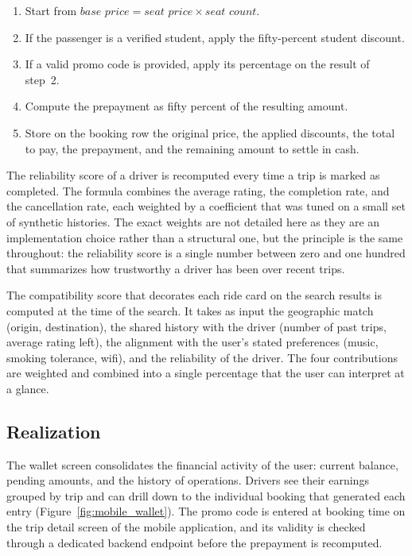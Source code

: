 \begin{enumerate}[noitemsep]
    \item Start from $\textit{base price} = \textit{seat price} \times \textit{seat count}$.
    \item If the passenger is a verified student, apply the fifty-percent student discount.
    \item If a valid promo code is provided, apply its percentage on the result of step~2.
    \item Compute the prepayment as fifty percent of the resulting amount.
    \item Store on the booking row the original price, the applied discounts, the total to pay, the prepayment, and the remaining amount to settle in cash.
\end{enumerate}

The reliability score of a driver is recomputed every time a trip is marked as completed. The formula combines the average rating, the completion rate, and the cancellation rate, each weighted by a coefficient that was tuned on a small set of synthetic histories. The exact weights are not detailed here as they are an implementation choice rather than a structural one, but the principle is the same throughout: the reliability score is a single number between zero and one hundred that summarizes how trustworthy a driver has been over recent trips.

The compatibility score that decorates each ride card on the search results is computed at the time of the search. It takes as input the geographic match (origin, destination), the shared history with the driver (number of past trips, average rating left), the alignment with the user's stated preferences (music, smoking tolerance, wifi), and the reliability of the driver. The four contributions are weighted and combined into a single percentage that the user can interpret at a glance.

\subsection{Realization}

The wallet screen consolidates the financial activity of the user: current balance, pending amounts, and the history of operations. Drivers see their earnings grouped by trip and can drill down to the individual booking that generated each entry (Figure~\ref{fig:mobile_wallet}). The promo code is entered at booking time on the trip detail screen of the mobile application, and its validity is checked through a dedicated backend endpoint before the prepayment is recomputed.

